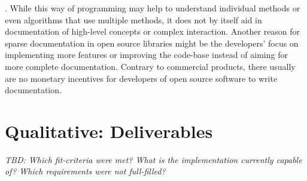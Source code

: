 . While this way of programming may help to understand individual methods or even algorithms that use multiple methods, it does not by itself aid in documentation of high-level concepts or complex interaction. Another reason for sparse documentation in open source libraries might be the developers' focus on implementing more features or improving the code-base instead of aiming for more complete documentation. Contrary to commercial products, there usually are no monetary incentives for developers of open source software to write documentation.

\section{Qualitative: Deliverables}
\label{sec:pm-deliverables}
\emph{TBD: Which fit-criteria were met? What is the implementation currently capable of? Which requirements were not full-filled?}